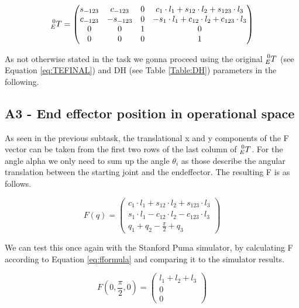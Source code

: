 \begin{equation}
   \prescript{0}{E}{T} = \begin{pmatrix} 
  s_{-123} & c_{-123} & 0 & c_1 \cdot l_1 + s_{12} \cdot l_2 + s_{123} \cdot l_3\\
   c_{-123} & -s_{-123} & 0& - s_1 \cdot l_1 + c_{12} \cdot l_2 + c_{123} \cdot l_3\\
  0& 0 & 1 &  0       \\
   0 & 0 & 0 & 1\end{pmatrix}
\end{equation}

\newline 
\newline
As not otherwise stated in the task we gonna proceed using the original $\prescript{0}{E}{T}$ (see Equation \ref{eq:TEFINAL}) and DH (see Table \ref{Table:DH}) parameters in the following.

\subsection{A3 - End effector position in operational space}
As seen in the previous subtask, the translational x and y components of the F vector can be taken from the first two rows of the last column of $\prescript{0}{E}{T}$.
For the angle alpha we only need to sum up the angle $\theta_i$ as those describe the angular translation between the starting joint and the endeffector. The resulting F is as follows. 

\begin{equation}
    F(q) = \begin{pmatrix} 
  c_1 \cdot l_1 + s_{12} \cdot l_2 + s_{123} \cdot l_3\\
  s_1 \cdot l_1 - c_{12} \cdot l_2 - c_{123} \cdot l_3\\
   q_1 + q_2 - \frac{\pi}{2} + q_3   \end{pmatrix}
   \label{eq:fformula}
\end{equation}


We can test this once again with the Stanford Puma simulator, by calculating F according to Equation \ref{eq:fformula} and comparing it to the simulator results.



\begin{equation}
    F(0,\frac{\pi}{2},0) = \begin{pmatrix} 
    l_1 + l_2 + l_3\\
    0 \\
    0  \end{pmatrix}
\end{equation}

